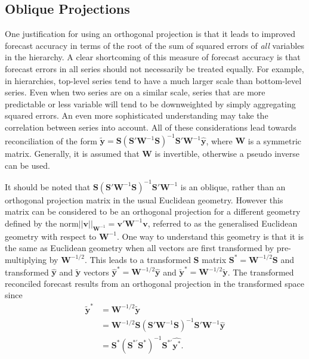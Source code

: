 \documentclass[12pt]{article}
\theoremstyle{definition}
\begin{document}
\subsection{Oblique Projections}\label{sec:oblique}

One justification for using an orthogonal projection is that it leads to improved forecast accuracy in terms of the root of the sum of squared errors of \emph{all} variables in the hierarchy. A clear shortcoming of this measure of forecast accuracy is that forecast errors in all series should not necessarily be treated equally. For example, in hierarchies, top-level series tend to have a much larger scale than bottom-level series. Even when two series are on a similar scale, series that are more predictable or less variable will tend to be downweighted by simply aggregating squared errors. An even more sophisticated understanding may take the correlation between series into account. All of these considerations lead towards reconciliation of the form $\tilde{\bm{y}}=\bm{S}(\bm{S}'\bm{W}^{-1}\bm{S})^{-1}\bm{S}'\bm{W}^{-1}\hat{\bm{y}}$, where $\bm{W}$ is a symmetric matrix. Generally, it is assumed that $\bm{W}$ is invertible, otherwise a pseudo inverse can be used.

It should be noted that $\bm{S}(\bm{S}'\bm{W}^{-1}\bm{S})^{-1}\bm{S}'\bm{W}^{-1}$ is an oblique, rather than an orthogonal projection matrix in the usual Euclidean geometry. However this matrix can be considered to be an orthogonal projection for a different geometry defined by the norm\break $||\bm{v}||_{{\bm W}^{-1}}=\bm{v}'\bm{W}^{-1}\bm{v}$, referred to as the generalised Euclidean geometry with respect to $\bm{W}^{-1}$. One way to understand this geometry is that it is the same as Euclidean geometry when all vectors are first transformed by pre-multiplying by $\bm{W}^{-1/2}$. This leads to a transformed $\bm{S}$ matrix $\bm{S}^*=\bm{W}^{-1/2}\bm{S}$ and transformed $\hat{\bm{y}}$ and $\tilde{\bm{y}}$ vectors $\hat{\bm{y}}^*=\bm{W}^{-1/2}\hat{\bm{y}}$ and $\tilde{\bm{y}}^*=\bm{W}^{-1/2}\tilde{\bm{y}}$. The transformed reconciled forecast results from an orthogonal projection in the transformed space since
\begin{align*}
  \tilde{\bm{y}}^*
    & = \bm{W}^{-1/2}\tilde{\bm{y}} \\
    & = \bm{W}^{-1/2}\bm{S}(\bm{S}'\bm{W}^{-1}\bm{S})^{-1}\bm{S}'\bm{W}^{-1}\hat{\bm{y}} \\
    & = \bm{S}^*(\bm{S}^{*'}\bm{S}^*)^{-1}\bm{S}^{*'}\hat{\bm{y}^*}.
\end{align*}
\end{document}
